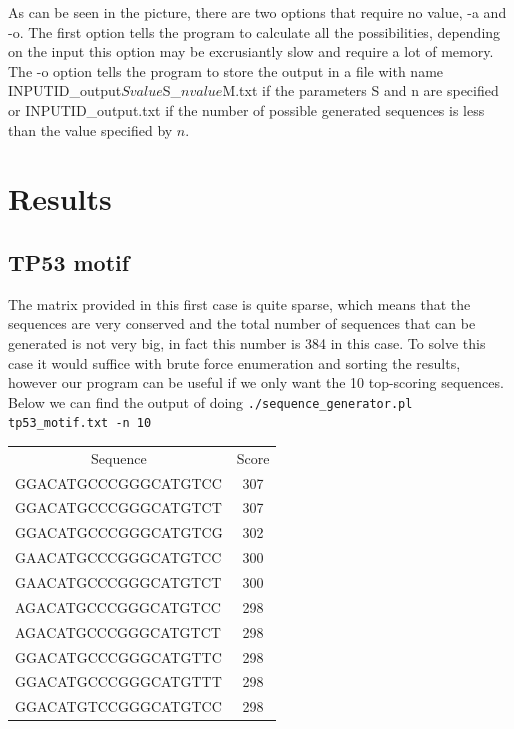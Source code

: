 \documentclass[10pt]{article}
\begin{document}
As can be seen in the picture, there are two options that require no value, -a and -o. The first option tells the program to calculate all the possibilities, depending on the input this option may be excrusiantly slow and require a lot of memory. The -o option tells the program to store the output in a file with name INPUTID\_output$Svalue$S\_$nvalue$M.txt if the parameters S and n are specified or INPUTID\_output.txt if the number of possible generated sequences is less than the value specified by $n$.
\section{Results}
\subsection{TP53 motif}
The matrix provided in this first case is quite sparse, which means that the sequences are very conserved and the total number of sequences that can be generated is not very big, in fact this number is 384 in this case. To solve this case it would suffice with brute force enumeration and sorting the results, however our program can be useful if we only want the 10 top-scoring sequences. Below we can find the output of doing \verb|./sequence_generator.pl tp53_motif.txt -n 10|

\begin{table}[h]
\centering
\begin{tabular}{lc}
\multicolumn{1}{c}{Sequence} & Score \\
GGACATGCCCGGGCATGTCC         & 307   \\
GGACATGCCCGGGCATGTCT         & 307   \\
GGACATGCCCGGGCATGTCG         & 302   \\
GAACATGCCCGGGCATGTCC         & 300   \\
GAACATGCCCGGGCATGTCT         & 300   \\
AGACATGCCCGGGCATGTCC         & 298   \\
AGACATGCCCGGGCATGTCT         & 298   \\
GGACATGCCCGGGCATGTTC         & 298   \\
GGACATGCCCGGGCATGTTT         & 298   \\
GGACATGTCCGGGCATGTCC         & 298  
\end{tabular}
\end{table}
\newpage
\end{document}

